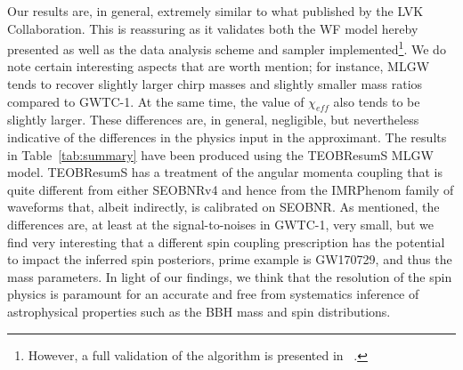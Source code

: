 Our results are, in general, extremely similar to what published by the LVK Collaboration. This is reassuring as it validates both the WF model hereby presented as well as the data analysis scheme and sampler implemented\footnote{However, a full validation of the algorithm is presented in ~\cite{}.}.
We do note certain interesting aspects that are worth mention; for instance, MLGW tends to recover slightly larger chirp masses and slightly 
smaller mass ratios compared to GWTC-1. At the same  time, the value of $\chi_{eff}$ also tends to be slightly larger. These differences are, in general, negligible, but nevertheless indicative of the differences in the physics input in the approximant. The results in Table~\ref{tab:summary} have been produced using the TEOBResumS MLGW model. TEOBResumS has a treatment of the angular momenta coupling that is quite different from either SEOBNRv4 and hence from the IMRPhenom family of waveforms that, albeit indirectly, is calibrated on SEOBNR. As mentioned, the differences are, at least at the signal-to-noises in GWTC-1, very small, but we find very interesting that a different spin coupling prescription has the potential to impact the inferred spin posteriors, prime example is GW170729, and thus the mass parameters. 
In light of our findings, we think that the resolution of the spin physics is paramount for an accurate and free from systematics inference of astrophysical properties such as the BBH mass and spin distributions.
